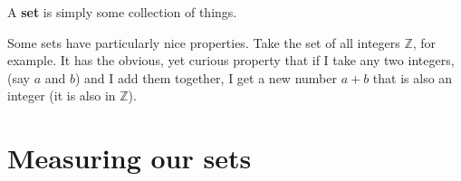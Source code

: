 \documentclass{article}
\begin{document}
A \textbf{set} is simply some collection of things. %

Some sets have particularly nice properties. Take the set of all integers $\mathbb{Z}$, for example. It has the obvious, yet curious property that if I take any two integers, (say $a$ and $b$) and I add them together, I get a new number $a + b$ that is also an integer (it is also in $\mathbb{Z}$). 





\section{Measuring our sets}


\end{document}

